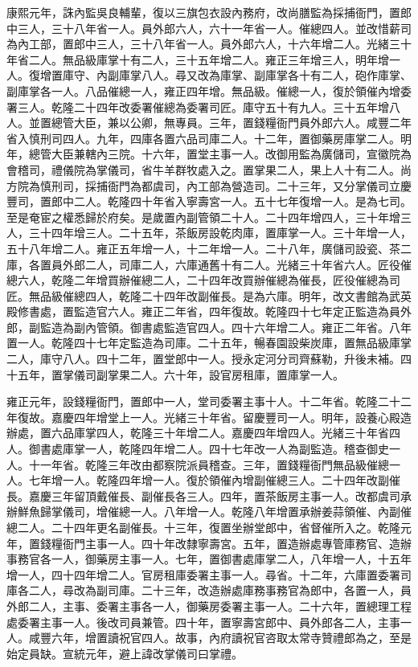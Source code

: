 \begin{pinyinscope}
康熙元年，誅內監吳良輔輩，復以三旗包衣設內務府，改尚膳監為採捕衙門，置郎中三人，三十八年省一人。員外郎六人，六十一年省一人。催總四人。並改惜薪司為內工部，置郎中三人，三十八年省一人。員外郎六人，十六年增二人。光緒三十年省二人。無品級庫掌十有二人，三十五年增二人。雍正三年增三人，明年增一人。復增置庫守、內副庫掌八人。尋又改為庫掌、副庫掌各十有二人，砲作庫掌、副庫掌各一人。八品催總一人，雍正四年增。無品級。催總一人，復於領催內增委署三人。乾隆二十四年改委署催總為委署司匠。庫守五十有九人。三十五年增八人。並置總管大臣，兼以公卿，無專員。三年，置錢糧衙門員外郎六人。咸豐二年省入慎刑司四人。九年，四庫各置六品司庫二人。十二年，置御藥房庫掌二人。明年，總管大臣兼轄內三院。十六年，置堂主事一人。改御用監為廣儲司，宣徽院為會稽司，禮儀院為掌儀司，省牛羊群牧處入之。置掌果二人，果上人十有二人。尚方院為慎刑司，採捕衙門為都虞司，內工部為營造司。二十三年，又分掌儀司立慶豐司，置郎中二人。乾隆四十年省入寧壽宮一人。五十七年復增一人。是為七司。至是奄宦之權悉歸於府矣。是歲置內副管領二十人。二十四年增四人，三十年增三人，三十四年增三人。二十五年，茶飯房設乾肉庫，置庫掌一人。三十年增一人，五十八年增二人。雍正五年增一人，十二年增一人。二十八年，廣儲司設瓷、茶二庫，各置員外郎二人，司庫二人，六庫通舊十有二人。光緒三十年省六人。匠役催總六人，乾隆二年增買辦催總二人，二十四年改買辦催總為催長，匠役催總為司匠。無品級催總四人，乾隆二十四年改副催長。是為六庫。明年，改文書館為武英殿修書處，置監造官六人。雍正二年省，四年復故。乾隆四十七年定正監造為員外郎，副監造為副內管領。御書處監造官四人。四十六年增二人。雍正二年省。八年置一人。乾隆四十七年定監造為司庫。二十五年，暢春園設柴炭庫，置無品級庫掌二人，庫守八人。四十二年，置堂郎中一人。授永定河分司齊蘇勒，升後未補。四十五年，置掌儀司副掌果二人。六十年，設官房租庫，置庫掌一人。

雍正元年，設錢糧衙門，置郎中一人，堂司委署主事十人。十二年省。乾隆二十二年復故。嘉慶四年增堂上一人。光緒三十年省。留慶豐司一人。明年，設養心殿造辦處，置六品庫掌四人，乾隆三十年增二人。嘉慶四年增四人。光緒三十年省四人。御書處庫掌一人，乾隆四年增二人。四十七年改一人為副監造。稽查御史一人。十一年省。乾隆三年改由都察院派員稽查。三年，置錢糧衙門無品級催總一人。七年增一人。乾隆四年增一人。復於領催內增副催總三人。二十四年改副催長。嘉慶三年留頂戴催長、副催長各三人。四年，置茶飯房主事一人。改都虞司承辦鮮魚歸掌儀司，增催總一人。八年增一人。乾隆八年增置承辦姜蒜領催、內副催總二人。二十四年更名副催長。十三年，復置坐辦堂郎中，省督催所入之。乾隆元年，置錢糧衙門主事一人。四十年改隸寧壽宮。五年，置造辦處專管庫務官、造辦事務官各一人，御藥房主事一人。七年，置御書處庫掌二人，八年增一人，十五年增一人，四十四年增二人。官房租庫委署主事一人。尋省。十二年，六庫置委署司庫各二人，尋改為副司庫。二十三年，改造辦處庫務事務官為郎中，各置一人，員外郎二人，主事、委署主事各一人，御藥房委署主事一人。二十六年，置總理工程處委署主事一人。後改司員兼管。四十年，置寧壽宮郎中、員外郎各二人，主事一人。咸豐六年，增置讀祝官四人。故事，內府讀祝官咨取太常寺贊禮郎為之，至是始定員缺。宣統元年，避上諱改掌儀司曰掌禮。


\end{pinyinscope}
